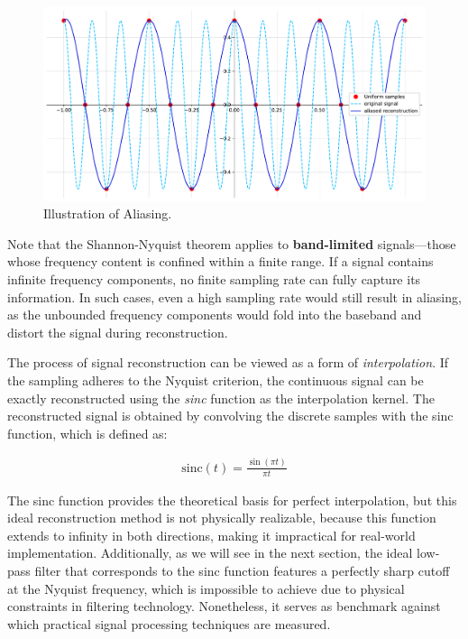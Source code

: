 \begin{figure}[!h]
  \centering
  \includegraphics[width=0.85\linewidth]{img/ch2/aliasing-signal.pdf}
  \caption{Illustration of Aliasing.}
  \label{f:aliasing-example}
\end{figure}

Note that the Shannon-Nyquist theorem applies to \textbf{band-limited} signals—those whose frequency content is confined within a finite range. If a signal contains infinite frequency components, no finite sampling rate can fully capture its information. In such cases, even a high sampling rate would still result in aliasing, as the unbounded frequency components would fold into the baseband and distort the signal during reconstruction.

The process of signal reconstruction can be viewed as a form of \textit{interpolation}. If the sampling adheres to the Nyquist criterion, the continuous signal can be exactly reconstructed using the \textit{sinc} function as the interpolation kernel. The reconstructed signal is obtained by convolving the discrete samples with the sinc function, which is defined as:

\begin{align}
  \text{sinc}(t) = \frac{\sin(\pi t)}{\pi t}
\end{align}

The sinc function provides the theoretical basis for perfect interpolation, but this ideal reconstruction method is not physically realizable, because this function extends to infinity in both directions, making it impractical for real-world implementation. Additionally, as we will see in the next section, the ideal low-pass filter that corresponds to the sinc function features a perfectly sharp cutoff at the Nyquist frequency, which is impossible to achieve due to physical constraints in filtering technology. Nonetheless, it serves as benchmark against which practical signal processing techniques are measured.

